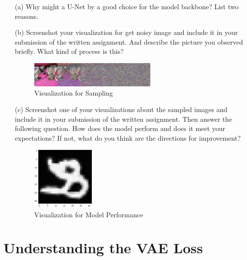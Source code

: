 \documentclass[a4paper]{article}
\begin{document}
\begin{itemize}
    \item [(a)]
    Why might a U-Net by a good choice for the model backbone? List two reasons.


    \item [(b)]
    Screenshot your visualization for get noisy image and include it in your submission of the written assignment. And describe the picture you observed briefly. What kind of process is this?

    \begin{figure}[htbp]
        \centering
        \includegraphics[width=0.6\textwidth]{sample.png}
        \caption{Visualization for Sampling}
        \label{fig:sample}
    \end{figure}
    

    \item [(c)]
    Screenshot one of your visualizations about the sampled images and include it in your submission of the written assignment. Then answer the following question. How does the model perform and does it meet your expectations? If not, what do you think are the directions for improvement?

    \begin{figure}[htbp]
        \centering
        \includegraphics[width=0.3\textwidth]{performance.png}
        \caption{Visualization for Model Performance}
        \label{fig:perf}
    \end{figure}

    
\end{itemize}

\section{Understanding the VAE Loss}
\end{document}
